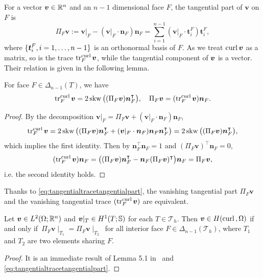 \documentclass[mathpazo]{cicp}
\begin{document}
For a vector $\boldsymbol v\in \mathbb R^n$ and an $n-1$ dimensional face $F$, the tangential part of $\boldsymbol v$ on $F$ is
$$
\Pi_F\boldsymbol v := \boldsymbol v|_F - (\boldsymbol v|_F\cdot\boldsymbol n_F)\boldsymbol n_F = \sum_{i=1}^{n-1}(\boldsymbol v|_F\cdot\boldsymbol t_{i}^F)\boldsymbol t_{i}^F,
$$ 
where $\{ \boldsymbol t_{i}^F, i=1,\ldots, n-1 \}$ is an orthonormal basis of $F$. 
As we treat ${\rm curl\,} \boldsymbol v$ as a matrix, so is the trace ${\rm tr}_F^{{\rm curl\,}}\boldsymbol v$, while the tangential component of $\boldsymbol v$ is a vector. Their relation is given in the following lemma.

\begin{lemma}
For face $F\in \Delta_{n-1}(T)$, 
we have 
\begin{equation}\label{eq:tangentialtracetangentialpart}
{\rm tr}_F^{{\rm curl\,}}\boldsymbol v = 2\operatorname{skw}\big((\Pi_F\boldsymbol v)\boldsymbol{n}_F^{\intercal}\big), \quad \Pi_F\boldsymbol v = ({\rm tr}_F^{{\rm curl\,}}\boldsymbol v)\boldsymbol{n}_F.
\end{equation}
\end{lemma}
\begin{proof}
By the decomposition $\boldsymbol v|_F =\Pi_F\boldsymbol v + (\boldsymbol v|_F\cdot\boldsymbol n_F)\boldsymbol n_F$,
$$
{\rm tr}_F^{{\rm curl\,}}\boldsymbol v=2\operatorname{skw}\big((\Pi_F\boldsymbol v)\boldsymbol{n}_F^{\intercal} + (\boldsymbol v|_F\cdot\boldsymbol n_F)\boldsymbol n_F\boldsymbol{n}_F^{\intercal}\big) = 2\operatorname{skw}\big((\Pi_F\boldsymbol v)\boldsymbol{n}_F^{\intercal}\big),
$$
which implies the first identity.
Then by $\boldsymbol{n}_F^{\intercal}\boldsymbol{n}_F=1$ and $(\Pi_F\boldsymbol v)^{\intercal}\boldsymbol{n}_F=0$,
$$
({\rm tr}_F^{{\rm curl\,}}\boldsymbol v)\boldsymbol{n}_F=\big((\Pi_F\boldsymbol v)\boldsymbol{n}_F^{\intercal} - \boldsymbol{n}_F(\Pi_F\boldsymbol v)^{\intercal}\big)\boldsymbol{n}_F=\Pi_F\boldsymbol v,
$$
i.e. the second identity holds.
\end{proof}
Thanks to \eqref{eq:tangentialtracetangentialpart}, the vanishing tangential part $\Pi_F\boldsymbol v$ and the vanishing tangential trace $({\rm tr}_F^{{\rm curl\,}}\boldsymbol v)$ are equivalent.

\begin{lemma}
Let $\boldsymbol v \in L^2(\Omega;\mathbb R^n)$ and $\boldsymbol v|_T\in H^{1}(T;\mathbb S)$ for each $T\in \mathcal T_h$. Then $\boldsymbol v \in H({\rm curl\,},\Omega)$ if and only if $\,\Pi_F\boldsymbol v\mid_{T_1} = \Pi_F\boldsymbol v\mid_{T_2}\,$ for all interior face $F\in \Delta_{n-1}(\mathcal T_h)$, where $T_1$ and $T_2$ are two elements sharing $F$.
\end{lemma}
\begin{proof}
It is an immediate result of  Lemma 5.1 in~\cite{ArnoldFalkWinther2006} and \eqref{eq:tangentialtracetangentialpart}.
\end{proof}
\end{document}
